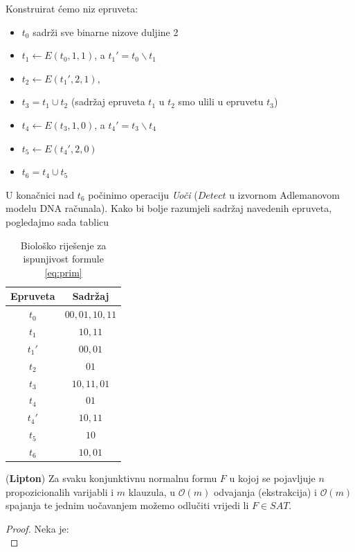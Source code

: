 \documentclass[12pt, a4paper]{book}
\begin{document}
\begin{spacing}{1.5}
\begin{exa}
Konstruirat ćemo niz epruveta:
\begin{itemize}
\item $t_0$ sadrži sve binarne nizove duljine 2
\item $t_1 \leftarrow E(t_0,1,1)$, a $t_1'=t_0\backslash t_1$
\item $t_2 \leftarrow E(t_1', 2,1)$, 
\item $t_3=t_1 \cup t_2$ (sadržaj epruveta $t_1$ u $t_2$ smo ulili u epruvetu $t_3$)
\item $t_4 \leftarrow E(t_3, 1,0)$, a $t_4'=t_3\backslash t_4$
\item $t_5 \leftarrow E(t_4',2,0)$
\item $t_6=t_4 \cup t_5$
\end{itemize}
U konačnici nad $t_6$ počinimo operaciju \textit{Uoči} ($Detect$ u izvornom Adlemanovom modelu DNA računala). Kako bi bolje razumjeli sadržaj navedenih epruveta, pogledajmo sada tablicu
\begin{table}[!h]
\begin{center}
\begin{tabular}{|c|c|}
\hline 
Epruveta & Sadržaj \\ 
\hline 
$t_0$ & $00,01,10,11$ \\ 
\hline 
$t_1$ & $10,11$ \\ 
\hline 
$t_1'$ & $00,01$ \\ 
\hline 
$t_2$ & $01$ \\ 
\hline 
$t_3$ & $10,11,01$ \\ 
\hline 
$t_4$ & $01$ \\ 
\hline 
$t_4'$ & $10,11$ \\ 
\hline 
$t_5$ & $10$ \\ 
\hline 
$t_6$ & $10,01$ \\ 
\hline 
\end{tabular} 
\end{center}
\label{tab:primjer}
\caption{Biološko riješenje za ispunjivost formule \ref{eq:prim}}
\end{table}
\end{exa}
\begin{thm} (\textbf{Lipton})
Za svaku konjunktivnu normalnu formu $F$ u kojoj se pojavljuje $n$ propozicionalih varijabli i $m$ klauzula, u $\mathcal{O}(m)$ odvajanja (ekstrakcija) i $\mathcal{O}(m)$ spajanja te jednim uočavanjem možemo odlučiti vrijedi li $F \in SAT$.
\end{thm}
\begin{proof}
Neka je:
\begin{equation}

\end{equation}
\end{proof}
\end{spacing}
\end{document}
